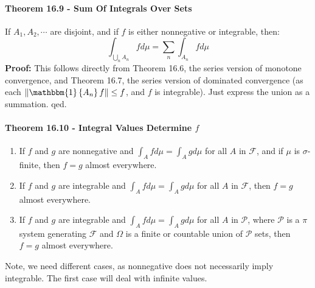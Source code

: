 \documentclass[12pt,a4paper]{article}
\newcommand{\1}[1]{\mathbbm{1}\left\{ #1 \right\}}
\newcommand{\fcal}{\mathcal{F}}
\newcommand{\pcal}{\mathcal{P}}
\begin{document}
\paragraph{Theorem 16.9 - Sum Of Integrals Over Sets} If $A_1, A_2, \cdots$ are disjoint, and if $f$ is either nonnegative or integrable, then:
$$
	\int_{\bigcup_n A_n} f d\mu =
	\sum_n \int_{A_n} f d\mu
$$
\textbf{Proof:} This follows directly from Theorem 16.6, the series version of monotone convergence, and Theorem 16.7, the series version of dominated convergence (as each $\|\1{A_n}f\| \leq f$, and $f$ is integrable). Just express the union as a summation. qed.

\paragraph{Theorem 16.10 - Integral Values Determine $f$}
\begin{enumerate}
	\item If $f$ and $g$ are nonnegative and $\int_A f d\mu = \int_A gd\mu$ for all $A$ in $\fcal$, and if $\mu$ is $\sigma$-finite, then $f = g$ almost everywhere.
	
	\item If $f$ and $g$ are integrable and $\int_A f d\mu = \int_A g d\mu$ for all $A$ in $\fcal$, then $f = g$ almost everywhere.
	
	\item If $f$ and $g$ are integrable and $\int_A f d\mu = \int_A g d\mu$ for all $A$ in $\pcal$, where $\pcal$ is a $\pi$ system generating $\fcal$ and $\Omega$ is a finite or countable union of $\pcal$ sets, then $f = g$ almost everywhere.
\end{enumerate} 
Note, we need different cases, as nonnegative does not necessarily imply integrable. The first case will deal with infinite values.
\\\\
\end{document}
